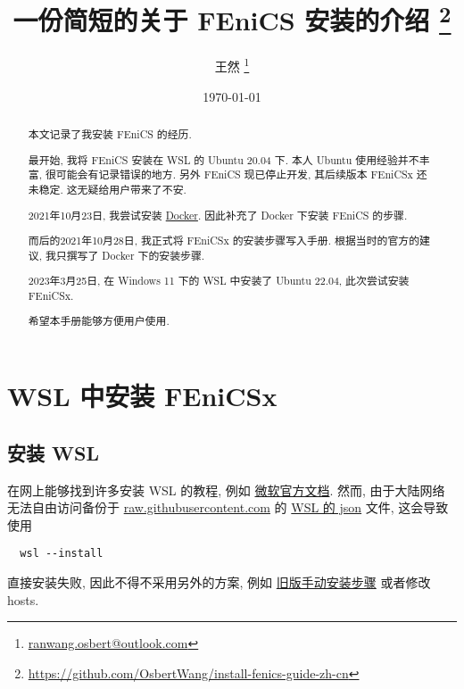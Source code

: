 \documentclass[fontset=founder]{ctexrep}
\title{\bfseries 一份简短的关于 FEniCS 安装的介绍%
  \thanks{\url{https://github.com/OsbertWang/install-fenics-guide-zh-cn}}%
}
\author{王然%
  \thanks{\href{mailto:ranwang.osbert@outlook.com}%
    {\ttfamily ranwang.osbert@outlook.com}}%
}
\date{\today}
\begin{document}
  
\maketitle

\begin{abstract}
  
  本文记录了我安装 FEniCS 的经历.
  
  最开始,
  我将 FEniCS 安装在 WSL 的 Ubuntu 20.04 下.
  本人 Ubuntu 使用经验并不丰富,
  很可能会有记录错误的地方.
  另外 FEniCS 现已停止开发,
  其后续版本 FEniCSx 还未稳定.
  这无疑给用户带来了不安.
  
  2021年10月23日,
  我尝试安装 \href{https://www.docker.com/get-started}{Docker}.
  因此补充了 Docker 下安装 FEniCS 的步骤.
  
  而后的2021年10月28日,
  我正式将 FEniCSx 的安装步骤写入手册.
  根据当时的官方的建议,
  我只撰写了 Docker 下的安装步骤.

  2023年3月25日,
  在 Windows 11 下的 WSL 中安装了 Ubuntu 22.04,
  此次尝试安装 FEniCSx.
  
  希望本手册能够方便用户使用.
\end{abstract}

\tableofcontents

\chapter{WSL 中安装 FEniCSx}

\section{安装 WSL}\label{sec:wsl.install}

在网上能够找到许多安装 WSL 的教程,
例如%
\href{https://learn.microsoft.com/zh-cn/windows/wsl/install}{微软官方文档}.
然而,
由于大陆网络无法自由访问备份于 \url{raw.githubusercontent.com} 的
\href{https://raw.githubusercontent.com/microsoft/WSL/master/distributions/DistributionInfo.json}{WSL 的 json} 文件,
这会导致使用
\begin{lstlisting}
  wsl --install
\end{lstlisting}
直接安装失败,
因此不得不采用另外的方案,
例如%
\href{https://learn.microsoft.com/zh-cn/windows/wsl/install-manual}{旧版手动安装步骤}%
或者修改 hosts.
\end{document}
